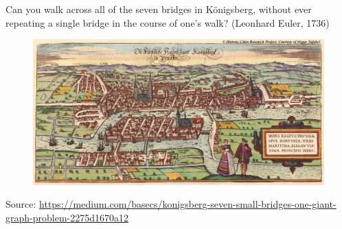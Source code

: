 \documentclass[aspectratio=169]{beamer}
\begin{document}
\begin{frame}
	
	\small Can you walk across all of the seven bridges in K\"onigsberg, without ever repeating a single bridge in the course of one's walk? (Leonhard Euler, 1736)
	
	\begin{figure}
		\centering
		\includegraphics[width=0.9\linewidth]{images/konigsberg_1}
	\end{figure}
	\tiny \tiny Source: \url{https://medium.com/basecs/konigsberg-seven-small-bridges-one-giant-graph-problem-2275d1670a12}
	
\end{frame}




 
\end{document}
